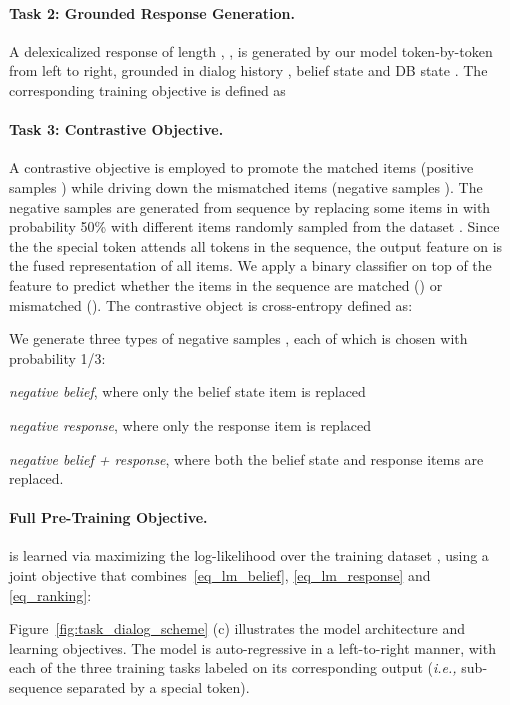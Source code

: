 \documentclass[11pt,a4paper]{article}
\newcommand{\ie}[0]{\emph{i.e., }}
\begin{document}
\paragraph{Task 2: Grounded Response Generation.}
A delexicalized response of length , , is generated by our model token-by-token from left to right, grounded in dialog history , belief state  and DB state .
The corresponding training objective is defined as



\paragraph{Task 3: Contrastive Objective.} 
A contrastive objective is employed to promote the matched items (positive samples ) while driving down the mismatched items (negative samples ).  
The negative samples are generated from sequence  by replacing some items in  with probability 50\% with different items randomly sampled from the dataset .  
Since the the special token  attends all tokens in the sequence, the output feature on  is the fused representation of all items. We apply a binary classifier on top of the feature to predict whether the items in the sequence are matched () or mismatched (). The contrastive object is cross-entropy defined as:

We generate three types of negative samples , each of which is chosen with probability 1/3:

{\em negative belief}, where only the belief state item is replaced

{\em negative response}, where only the response item is replaced

{\em negative belief + response}, where both the belief state and response items are replaced.

\paragraph{Full Pre-Training Objective.} 
 is learned via maximizing the log-likelihood over the training dataset , using a joint objective that combines~\eqref{eq_lm_belief}, \eqref{eq_lm_response} and \eqref{eq_ranking}:

Figure~\ref{fig:task_dialog_scheme} (c) illustrates the model architecture and learning objectives. The model is auto-regressive in a left-to-right manner, with each of the three training tasks labeled on its corresponding output (\ie sub-sequence separated by a special token). 
\end{document}
